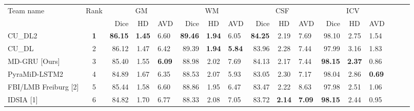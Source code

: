 \documentclass[a4paper,9pt]{llncs}
\begin{document}
\begin{table}
\begin{center}
\label{mrbrainsres}
 \scriptsize
\begin{tabular}{l c rcl rcl rcl rcl rcl}
\toprule
Team name &  Rank &\multicolumn{3}{c}{GM} & \multicolumn{3}{c}{WM} & \multicolumn{3}{c}{CSF} &  \multicolumn{3}{c}{ICV}\\%
&  & Dice & HD & AVD & Dice & HD & AVD & Dice & HD & AVD & Dice & HD & AVD \\\midrule
CU\_DL2  & \textbf{1}& \textbf{86.15} & \textbf{1.45} & 6.60 & \textbf{89.46} & \textbf{1.94} & 6.05 & \textbf{84.25}& 2.19 & 7.69 &  98.10 & 2.75 & 1.54\\
CU\_DL& 2  & 86.12 & 1.47 & 6.42 & 89.39 & \textbf{1.94} & \textbf{5.84} & 83.96 & 2.28 & 7.44 &  97.99 & 3.16 & 1.83 \\
MD-GRU [Ours] & 3 & 85.40 & 1.55 & \textbf{6.09} & 88.98 & 2.02 & 7.69 & 84.13 & 2.17 & 7.44 & \textbf{98.15} & \textbf{2.37} & 0.86\\
PyraMiD-LSTM2 & 4 & 84.89 & 1.67 & 6.35 & 88.53 & 2.07 & 5.93 & 83.05 & 2.30 & 7.17 &  98.04 & 2.86 & \textbf{0.69}\\
FBI/LMB Freiburg [2]& 5 & 85.44 & 1.58 & 6.60 & 88.86 & 1.95 & 6.47 & 83.47 & 2.22 & 8.63 &  97.98 & 2.51 & 1.06\\
IDSIA [1]& 6 & 84.82 & 1.70 & 6.77 & 88.33 & 2.08 & 7.05& 83.72 & \textbf{2.14} & \textbf{7.09}& \textbf{98.15} & 2.44 & 0.95\\\bottomrule
\end{tabular}
\end{center}
 \label{resultschallenge}
\end{table}
\end{document}
